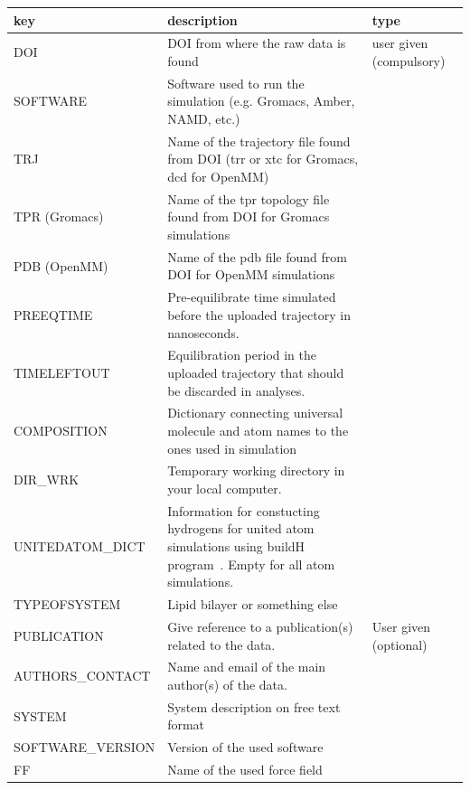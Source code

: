 \documentclass[fleqn,10pt]{wlscirep}
\begin{document}
\begin{table}[p]
    \centering
    \begin{tabular}{  p{3.5cm}  p{9.5cm}  p{4.0cm} }
    \toprule
    key & description & type  \\
    \midrule
    DOI & DOI from where the raw data is found & user given (compulsory) \\
    SOFTWARE & Software used to run the simulation (e.g. Gromacs, Amber, NAMD, etc.) & \\
    TRJ & Name of the trajectory file found from DOI (trr or xtc for Gromacs, dcd for OpenMM) & \\
    TPR (Gromacs) & Name of the tpr topology file found from DOI for Gromacs simulations & \\
    PDB (OpenMM) & Name of the pdb file found from DOI for OpenMM simulations & \\
    PREEQTIME & Pre-equilibrate time simulated before the uploaded trajectory in nanoseconds. 
    & \\
    TIMELEFTOUT & Equilibration period in the uploaded trajectory that should be discarded in analyses. 
    & \\
    COMPOSITION & Dictionary connecting universal molecule and atom names to the ones used in simulation & \\
    DIR\_WRK & Temporary working directory in your local computer. \\
    UNITEDATOM\_DICT & Information for constucting hydrogens for united atom simulations using buildH program~\cite{santuz21}. Empty for all atom simulations. & \\
    TYPEOFSYSTEM & Lipid bilayer or something else & \\
    \hline
    PUBLICATION & Give reference to a publication(s) related to the data. & User given (optional)\\
    AUTHORS\_CONTACT & Name and email of the main author(s) of the data. & \\
    SYSTEM & System description on free text format & \\
    SOFTWARE\_VERSION & Version of the used software & \\
    FF & Name of the used force field & \\

\end{tabular}
\end{table}
\end{document}
